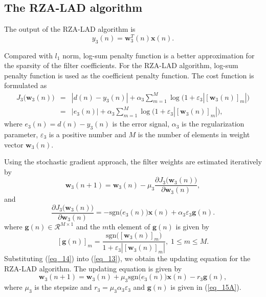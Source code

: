 \documentclass[conference]{IEEEtran}
\begin{document}
\subsection {The RZA-LAD algorithm}
\label{S2-3}
The output of the RZA-LAD algorithm is 
\begin{equation}
\label{eq_11}
y_3(n) = \mathbf{w}_3^T(n)\mathbf{x}(n).
\end{equation}

Compared with $l_1$ norm, log-sum penalty function is a better approximation for the sparsity of the filter coefficients. For the RZA-LAD algorithm, log-sum penalty function is used as the coefficient penalty function. The cost function is formulated as
\setlength\arraycolsep{0.1em}
\begin{eqnarray}
\label{eq_12}
J_3\big(\mathbf{w}_3(n)\big)  &=& \left|d(n) - y_3(n)  \right| + \alpha_3 \sum_{m=1}^{M} \log \big(1 + \varepsilon_3 |[\mathbf{w}_3(n)]_m|\big) \nonumber\\
&=& \left| e_3(n) \right| + \alpha_3 \sum_{m=1}^{M} \log \big(1 + \varepsilon_3 |[\mathbf{w}_3(n)]_m|\big),
\end{eqnarray}
where $e_3(n) = d(n) - y_3(n)$ is the error signal, $\alpha_3$ is the regularization parameter, $\varepsilon_3$ is a positive number and $M$ is the number of elements in weight vector $\mathbf{w}_3(n)$.

Using the stochastic gradient approach, the filter weights are estimated iteratively by
\begin{equation}
\label{eq_13}
\mathbf{w}_3(n+1)=\mathbf{w}_3(n) - \mu_3\frac{ \partial J_3\big(\mathbf{w}_3(n)\big)}{ \partial \mathbf{w}_3(n)},
\end{equation}
and 
\begin{equation}
\label{eq_14}
\frac{ \partial J_3\big(\mathbf{w}_3(n)\big)}{ \partial \mathbf{w}_3(n)} = -\textrm{sgn} \big(e_3(n)\big)\mathbf{x}(n)  +  \alpha_3\varepsilon_3\mathbf{g}(n).
\end{equation}
where $\mathbf{g}(n) \in \mathcal{R}^{M \times 1}$ and the $m$th element of $\mathbf{g}(n)$ is given by
\begin{equation}
\label{eq_15A}
\left[ \mathbf{g}(n) \right]_m =  \frac{ \textrm{sgn} \big([\mathbf{w}_3(n)]_m\big)}{1+\varepsilon_3 \left|[\mathbf{w}_3(n)]_m \right|},\; 1 \leq m \leq M.
\end{equation}
Substituting (\ref{eq_14}) into (\ref{eq_13}), we obtain the updating equation for the RZA-LAD algorithm.
The updating equation is given by
\begin{equation}
\label{eq_15}
\mathbf{w}_3(n+1) = \mathbf{w}_3(n) + \mu_3\textrm{sgn} \big(e_3(n)\big)\mathbf{x}(n)  - r_3\mathbf{g}(n),
\end{equation}
where $\mu_3$ is the stepsize and $r_3=\mu_3\alpha_3\varepsilon_3$ and $\mathbf{g}(n)$ is given in (\ref{eq_15A}).
\end{document}
